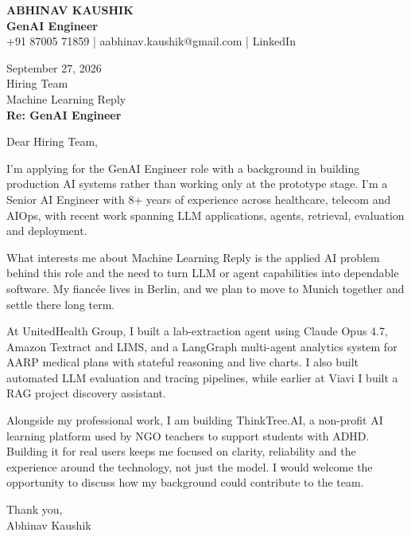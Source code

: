 \documentclass[10pt,a4paper]{article}
\begin{document}
\begin{center}
{\Large\bfseries ABHINAV KAUSHIK}\\[2pt]
{\bfseries GenAI Engineer}\\[2pt]
+91 87005 71859 \quad | \quad aabhinav.kaushik@gmail.com \quad | \quad LinkedIn
\end{center}
\vspace{8pt}
September 27, 2026\\[6pt]
Hiring Team\\
Machine Learning Reply\\[4pt]
\textbf{Re: GenAI Engineer}

Dear Hiring Team,

I’m applying for the GenAI Engineer role with a background in building production AI systems rather than working only at the prototype stage. I’m a Senior AI Engineer with 8+ years of experience across healthcare, telecom and AIOps, with recent work spanning LLM applications, agents, retrieval, evaluation and deployment.

What interests me about Machine Learning Reply is the applied AI problem behind this role and the need to turn LLM or agent capabilities into dependable software. My fiancée lives in Berlin, and we plan to move to Munich together and settle there long term.

At UnitedHealth Group, I built a lab-extraction agent using Claude Opus 4.7, Amazon Textract and LIMS, and a LangGraph multi-agent analytics system for AARP medical plans with stateful reasoning and live charts. I also built automated LLM evaluation and tracing pipelines, while earlier at Viavi I built a RAG project discovery assistant.

Alongside my professional work, I am building ThinkTree.AI, a non-profit AI learning platform used by NGO teachers to support students with ADHD. Building it for real users keeps me focused on clarity, reliability and the experience around the technology, not just the model. I would welcome the opportunity to discuss how my background could contribute to the team.

Thank you,\\
Abhinav Kaushik
\end{document}
